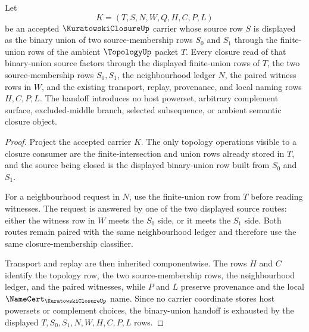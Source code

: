 \begin{theorem}
\label{thm:kuratowski-closure-finite-union-handoff}
Let
$$
K=(T,S,N,W,Q,H,C,P,L)
$$
be an accepted $\KuratowskiClosureUp$ carrier whose source row $S$ is displayed as the binary union of two source-membership rows $S_0$ and $S_1$ through the finite-union rows of the ambient $\TopologyUp$ packet $T$. Every closure read of that binary-union source factors through the displayed finite-union rows of $T$, the two source-membership rows $S_0,S_1$, the neighbourhood ledger $N$, the paired witness rows in $W$, and the existing transport, replay, provenance, and local naming rows $H,C,P,L$. The handoff introduces no host powerset, arbitrary complement surface, excluded-middle branch, selected subsequence, or ambient semantic closure object.
\end{theorem}
\begin{proof}
Project the accepted carrier $K$. The only topology operations visible to a closure consumer are the finite-intersection and union rows already stored in $T$, and the source being closed is the displayed binary-union row built from $S_0$ and $S_1$.

For a neighbourhood request in $N$, use the finite-union row from $T$ before reading witnesses. The request is answered by one of the two displayed source routes: either the witness row in $W$ meets the $S_0$ side, or it meets the $S_1$ side. Both routes remain paired with the same neighbourhood ledger and therefore use the same closure-membership classifier.

Transport and replay are then inherited componentwise. The rows $H$ and $C$ identify the topology row, the two source-membership rows, the neighbourhood ledger, and the paired witnesses, while $P$ and $L$ preserve provenance and the local $\NameCert_{\KuratowskiClosureUp}$ name. Since no carrier coordinate stores host powersets or complement choices, the binary-union handoff is exhausted by the displayed $T,S_0,S_1,N,W,H,C,P,L$ rows.
\end{proof}


